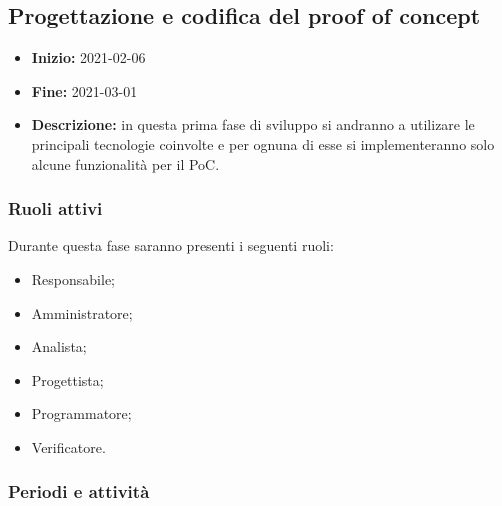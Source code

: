 
\subsection{Progettazione e codifica del proof of concept} \label{_pianificazioneCodificaPoC}
\begin{itemize}
    \item []\textbf{Inizio:} 2021-02-06
    \item []\textbf{Fine:} 2021-03-01
    \item []\textbf{Descrizione:} in questa prima fase di sviluppo si andranno a utilizare le principali tecnologie coinvolte e per ognuna di esse si implementeranno solo alcune funzionalità per il PoC.
\end{itemize}

\subsubsection{Ruoli attivi}
Durante questa fase saranno presenti i seguenti ruoli:
\begin{itemize}
    \item Responsabile;
    \item Amministratore;
    \item Analista;
    \item Progettista;
    \item Programmatore;
    \item Verificatore.
\end{itemize}

\subsubsection{Periodi e attività}

